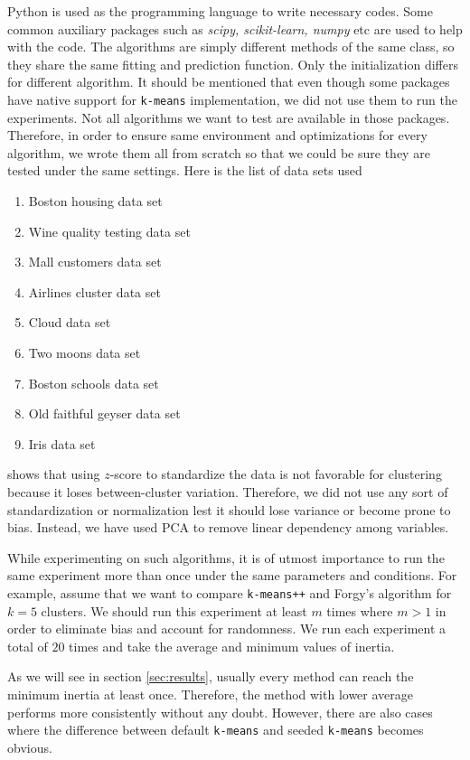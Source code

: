 \documentclass[twoside, 11pt]{article}
\begin{document}
	Python is used as the programming language to write necessary codes. Some common auxiliary packages such as \textit{scipy, scikit-learn, numpy} etc are used to help with the code. The algorithms are simply different methods of the same class, so they share the same fitting and prediction function. Only the initialization differs for different algorithm. It should be mentioned that even though some packages have native support for \texttt{k-means} implementation, we did not use them to run the experiments. Not all algorithms we want to test are available in those packages. Therefore, in order to ensure same environment and optimizations for every algorithm, we wrote them all from scratch so that we could be sure they are tested under the same settings. Here is the list of data sets used
		\begin{enumerate}[i]
			\item Boston housing data set
			\item Wine quality testing data set
			\item Mall customers data set
			\item Airlines cluster data set
			\item Cloud data set
			\item Two moons data set
			\item Boston schools data set
			\item Old faithful geyser data set
			\item Iris data set
		\end{enumerate}
	\cite{miligan} shows that using $z$-score to standardize the data is not favorable for clustering because it loses between-cluster variation. Therefore, we did not use any sort of standardization or normalization lest it should lose variance or become prone to bias. Instead, we have used PCA to remove linear dependency among variables. 
	
	While experimenting on such algorithms, it is of utmost importance to run the same experiment more than once under the same parameters and conditions. For example, assume that we want to compare \texttt{k-means++} and Forgy's algorithm \citep{forgy} for $k=5$ clusters. We should run this experiment at least $m$ times where $m>1$ in order to eliminate bias and account for randomness. We run each experiment a total of $20$ times and take the average and minimum values of inertia.
	
	As we will see in section \eqref{sec:results}, usually every method can reach the minimum inertia at least once. Therefore, the method with lower average performs more consistently without any doubt. However, there are also cases where the difference between default \texttt{k-means} and seeded \texttt{k-means} becomes obvious.
\end{document}
